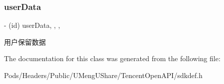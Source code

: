 \subsubsection{\texorpdfstring{user\+Data}{userData}}
{\footnotesize\ttfamily -\/ (id) user\+Data\hspace{0.3cm}{\ttfamily [read]}, {\ttfamily [write]}, {\ttfamily [nonatomic]}, {\ttfamily [retain]}}

用户保留数据 

The documentation for this class was generated from the following file\+:\begin{DoxyCompactItemize}
\item 
Pods/\+Headers/\+Public/\+U\+Meng\+U\+Share/\+Tencent\+Open\+A\+P\+I/sdkdef.\+h\end{DoxyCompactItemize}
